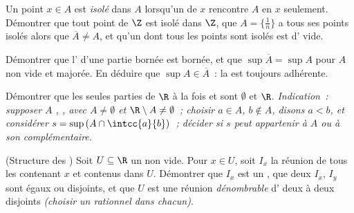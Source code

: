 \begin{exercise}[$\star\star$]\label{exo:b1:topology:7}
Un point $x \in A$ est \emph{isolé} dans $A$ lorsqu'un  de
$x$ rencontre $A$ en $x$ seulement. Démontrer que tout point de $\Z$
est isolé dans $\Z$, que $A = \{\frac1n\}$ a tous ses points isolés
alors que $\overline A \neq A$, et qu'un  dont tous les points
sont isolés est d' vide.
\end{exercise}

\begin{exercise}[$\star\star$]\label{exo:b1:topology:8}
Démontrer que l' d'une partie bornée est bornée, et que
$\sup \overline A = \sup A$ pour $A$ non vide et majorée. En déduire
que $\sup A \in \overline A$~: la  est toujours adhérente.
\end{exercise}

\begin{exercise}[$\star\star\star$]\label{exo:b1:topology:9}
Démontrer que les seules parties de $\R$ à la fois  et 
sont $\emptyset$ et $\R$. \emph{Indication~: supposer $A$ ,
, avec $A \neq \emptyset$ et $\R \setminus A \neq \emptyset$~;
choisir $a \in A$, $b \notin A$, disons $a < b$, et considérer $s =
\sup\,(A \cap \intcc{a}{b})$~; décider si $s$ peut appartenir à $A$ ou
à son complémentaire.}
\end{exercise}

\begin{exercise}[$\star\star\star$]\label{exo:b1:topology:10}
(Structure des ) Soit $U \subseteq \R$ un  non vide. Pour
$x \in U$, soit $I_x$ la réunion de tous les  
contenant $x$ et contenus dans $U$. Démontrer que $I_x$ est un
 , que deux  $I_x$, $I_y$ sont égaux ou
disjoints, et que $U$ est une réunion \emph{dénombrable} d'
 deux à deux disjoints \emph{(choisir un rationnel dans
chacun)}.
\end{exercise}


